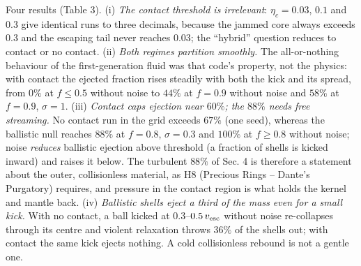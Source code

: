 \documentclass[
  11pt,
]{article}
\begin{document}
Four results (Table 3). (i) \emph{The contact threshold is irrelevant}:
\(\eta_c = 0.03\), \(0.1\) and \(0.3\) give identical runs to three
decimals, because the jammed core always exceeds \(0.3\) and the
escaping tail never reaches \(0.03\); the ``hybrid'' question reduces to
contact or no contact. (ii) \emph{Both regimes partition smoothly.} The
all-or-nothing behaviour of the first-generation fluid was that code's
property, not the physics: with contact the ejected fraction rises
steadily with both the kick and its spread, from \(0\%\) at
\(f \le 0.5\) without noise to \(44\%\) at \(f = 0.9\) without noise and
\(58\%\) at \(f = 0.9\), \(\sigma = 1\). (iii) \emph{Contact caps
ejection near \(60\%\); the \(88\%\) needs free streaming.} No contact
run in the grid exceeds \(67\%\) (one seed), whereas the ballistic null
reaches \(88\%\) at \(f = 0.8\), \(\sigma = 0.3\) and \(100\%\) at
\(f \ge 0.8\) without noise; noise \emph{reduces} ballistic ejection
above threshold (a fraction of shells is kicked inward) and raises it
below. The turbulent \(88\%\) of Sec. 4 is therefore a statement about
the outer, collisionless material, as H8 (Precious Rings -- Dante's
Purgatory) requires, and pressure in the contact region is what holds
the kernel and mantle back. (iv) \emph{Ballistic shells eject a third of
the mass even for a small kick.} With no contact, a ball kicked at
\(0.3\)--\(0.5\,v_{\rm esc}\) without noise re-collapses through its
centre and violent relaxation throws \(36\%\) of the shells out; with
contact the same kick ejects nothing. A cold collisionless rebound is
not a gentle one.
\end{document}
